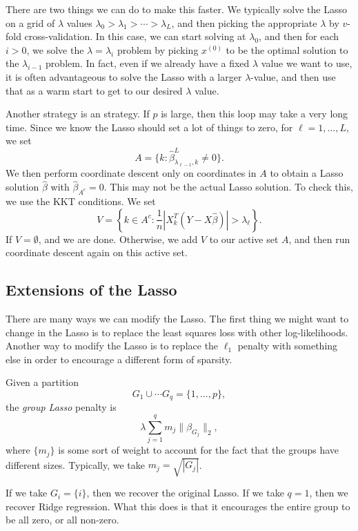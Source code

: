 \documentclass[a4paper]{article}
\begin{document}
There are two things we can do to make this faster. We typically solve the Lasso on a grid of $\lambda$ values $\lambda_0 > \lambda_1 > \cdots > \lambda_L$, and then picking the appropriate $\lambda$ by $v$-fold cross-validation. In this case, we can start solving at $\lambda_0$, and then for each $i > 0$, we solve the $\lambda = \lambda_i$ problem by picking $x^{(0)}$ to be the optimal solution to the $\lambda_{i - 1}$ problem. In fact, even if we already have a fixed $\lambda$ value we want to use, it is often advantageous to solve the Lasso with a larger $\lambda$-value, and then use that as a warm start to get to our desired $\lambda$ value.

Another strategy is an  strategy. If $p$ is large, then this loop may take a very long time. Since we know the Lasso should set a lot of things to zero, for $\ell = 1, \ldots, L$, we set
\[
  A = \{ k : \hat{\beta}^L_{\lambda_{\ell - 1}, k} \not= 0 \}.
\]
We then perform coordinate descent only on coordinates in $A$ to obtain a Lasso solution $\hat{\beta}$ with $\hat{\beta}_{A^c} = 0$. This may not be the actual Lasso solution. To check this, we use the KKT conditions. We set
\[
  V = \left\{k \in A^c: \frac{1}{n} |X_k^T(Y - X \hat{\beta})| > \lambda_\ell \right\}.
\]
If $V = \emptyset$, and we are done. Otherwise, we add $V$ to our active set $A$, and then run coordinate descent again on this active set.

\subsection{Extensions of the Lasso}
There are many ways we can modify the Lasso. The first thing we might want to change in the Lasso is to replace the least squares loss with other log-likelihoods. Another way to modify the Lasso is to replace the $\ell_1$ penalty with something else in order to encourage a different form of sparsity.

\begin{eg}
  Given a partition
  \[
    G_1 \cup \cdots G_q = \{1, \ldots, p\},
  \]
  the \emph{group Lasso} penalty is
  \[
    \lambda \sum_{j = 1}^q m_j \|\beta_{G_j}\|_2,
  \]
  where $\{m_j\}$ is some sort of weight to account for the fact that the groups have different sizes. Typically, we take $m_j = \sqrt{|G_j|}$.

  If we take $G_i = \{i\}$, then we recover the original Lasso. If we take $q = 1$, then we recover Ridge regression. What this does is that it encourages the entire group to be all zero, or all non-zero.
\end{eg}
\end{document}

